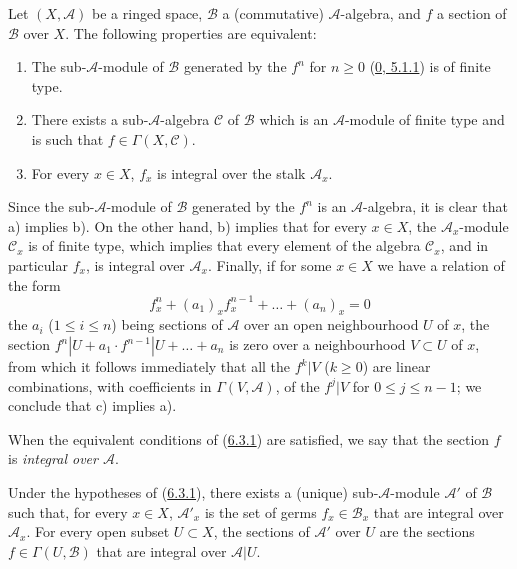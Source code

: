 \begin{proposition}[6.3.1]
\label{II.6.3.1}
Let $(X,\mathcal{A})$ be a ringed space, $\mathcal{B}$ a (commutative)
$\mathcal{A}$-algebra, and $f$ a section of $\mathcal{B}$ over $X$. The
following properties are equivalent:
\begin{enumerate}
\item[a)] The sub-$\mathcal{A}$-module of $\mathcal{B}$ generated by the
$f^n$ for $n\geq 0$ (\hyperref[0.5.1.1]{0, 5.1.1}) is of finite type.
\item[b)] There exists a sub-$\mathcal{A}$-algebra $\mathcal{C}$ of
$\mathcal{B}$ which is an $\mathcal{A}$-module of finite type and is such
that $f\in\Gamma(X,\mathcal{C})$.
\item[c)] For every $x\in X$, $f_x$ is integral over the stalk
$\mathcal{A}_x$.
\end{enumerate}
\end{proposition}


Since the sub-$\mathcal{A}$-module of $\mathcal{B}$ generated by the $f^n$ is
an $\mathcal{A}$-algebra, it is clear that a) implies b). On the other hand,
b) implies that for every $x\in X$, the $\mathcal{A}_x$-module
$\mathcal{C}_x$ is of finite type, which implies that every element of the
algebra $\mathcal{C}_x$, and in particular $f_x$, is integral over
$\mathcal{A}_x$. Finally, if for some $x\in X$ we have a relation of the form
\[
f_x^n+(a_1)_xf_x^{n-1}+\ldots+(a_n)_x=0
\]
the $a_i$ ($1\leq i\leq n$) being sections of $\mathcal{A}$ over an open
neighbourhood $U$ of $x$, the section
$f^n|U+a_1\cdot f^{n-1}|U+\ldots+a_n$ is zero over a neighbourhood
$V\subset U$ of $x$, from which it follows immediately that all the $f^k|V$
($k\geq0$) are linear combinations, with coefficients in
$\Gamma(V,\mathcal{A})$, of the $f^j|V$ for $0\leq j\leq n-1$; we conclude
that c) implies a).

When the equivalent conditions of (\hyperref[II.6.3.1]{6.3.1}) are
satisfied, we say that the section $f$ is \emph{integral over
$\mathcal{A}$}.

\begin{corollary}[6.3.2]
\label{II.6.3.2}
Under the hypotheses of (\hyperref[II.6.3.1]{6.3.1}), there exists a
(unique) sub-$\mathcal{A}$-module $\mathcal{A}'$ of $\mathcal{B}$ such that,
for every $x\in X$, $\mathcal{A}'_x$ is the set of germs
$f_x\in\mathcal{B}_x$ that are integral over $\mathcal{A}_x$. For every open
subset $U\subset X$, the sections of $\mathcal{A}'$ over $U$ are the sections
$f\in\Gamma(U,\mathcal{B})$ that are integral over
$\mathcal{A}|U$.
\end{corollary}

